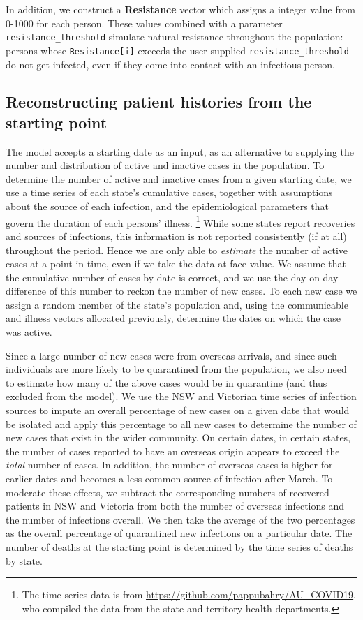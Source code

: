 \documentclass[submission]{grattan}
\newcommand*{\code}[1]{\texttt{#1}}
\newcommand*{\defi}[1]{\textbf{#1}}
\begin{document}
 In addition, we construct a \defi{Resistance} vector which assigns a integer value from 0-1000
 for each person. These values combined with a parameter \code{resistance\_threshold} simulate
 natural resistance throughout the population: persons whose \code{Resistance[i]} exceeds
 the user-supplied \code{resistance\_threshold} do not get infected, even if they come into 
 contact with an infectious person. 

\subsection{Reconstructing patient histories from the starting point}
The model accepts a starting date as an input, as an alternative to supplying the
number and distribution of active and inactive cases in the population.
 To determine the number of active and inactive cases from a given starting date,
 we use a time series of each state's cumulative cases, together with assumptions
 about the source of each infection, and the epidemiological parameters that govern
 the duration of each persons' illness.%
 	\footnote{The time series data is from \url{https://github.com/pappubahry/AU_COVID19}, who
 	compiled the data from the state and territory health departments.}
 While some states
 	report recoveries and sources of infections, this information is not reported consistently
 	 (if at all) throughout the period.
Hence we are only able to \emph{estimate} the number of active cases at a point in time,
even if we take the data at face value. We assume that the cumulative number of cases
by date is correct, and we use the day-on-day difference of this number to reckon the
number of new cases. To each new case we assign a random member of the state's population and,
using the communicable and illness vectors allocated previously, determine the dates on which
the case was active.

Since a large number of new cases were from overseas arrivals, and since such individuals are more
likely to be quarantined from the population, we also need to estimate how many of the
above cases would be in quarantine (and thus excluded from the model). We use the NSW and
Victorian time series of infection sources to impute an overall percentage of new cases
on a given date that would be isolated and apply this percentage to all new cases to
determine the number of new cases that exist in the wider community. On certain dates,
in certain states,
the number of cases reported to have an overseas origin appears to exceed the \emph{total}
number of cases. In addition, the number of overseas cases is higher for earlier dates and
becomes a less common source of infection after March. To moderate these effects, we subtract
the corresponding numbers of recovered patients in NSW and Victoria from both the number of
overseas infections and the number of infections overall. We then take the average of the
two percentages as the overall percentage of quarantined new infections on a particular date.
The number of deaths at the starting point is determined by the time series of deaths by state.
\end{document}
